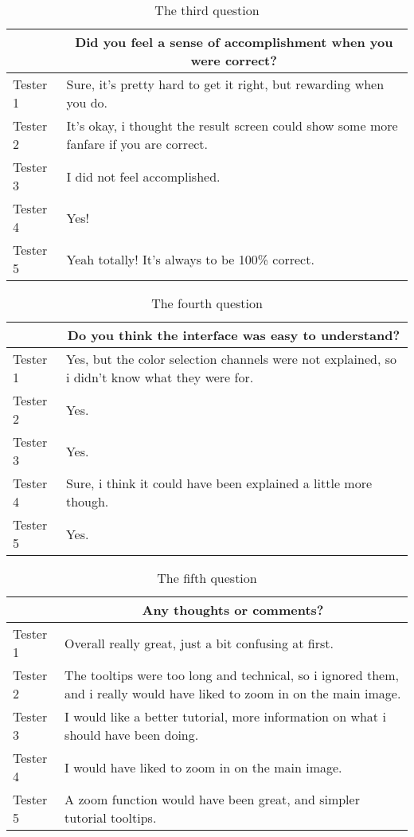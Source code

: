 \begin{table}[H]
\centering
\caption{The third question}
\label{tab:question3}
\begin{tabular}{p{1.3cm}p{10cm}}
\toprule
 & \multicolumn{1}{c}{Did you feel a sense of accomplishment when you were correct?} \\ \midrule
Tester 1 & Sure, it's pretty hard to get it right, but rewarding when you do. \\
Tester 2 & It's okay, i thought the result screen could show some more fanfare if you are correct. \\
Tester 3 & I did not feel accomplished. \\
Tester 4 & Yes! \\
Tester 5 & Yeah totally! It's always to be 100\% correct. \\ \bottomrule
\end{tabular}
\end{table}

\begin{table}[H]
\centering
\caption{The fourth question}
\label{tab:question4}
\begin{tabular}{p{1.3cm}p{10cm}}
\toprule
 & \multicolumn{1}{c}{Do you think the interface was easy to understand?} \\ \midrule
Tester 1 & Yes, but the color selection channels were not explained, so i didn't know what they were for. \\
Tester 2 & Yes. \\
Tester 3 & Yes. \\
Tester 4 & Sure, i think it could have been explained a little more though. \\
Tester 5 & Yes. \\ \bottomrule
\end{tabular}
\end{table}

\begin{table}[H]
\centering
\caption{The fifth question}
\label{tab:question5}
\begin{tabular}{p{1.3cm}p{10cm}}
\toprule
 & \multicolumn{1}{c}{Any thoughts or comments?} \\ \midrule
Tester 1 & Overall really great, just a bit confusing at first. \\
Tester 2 & The tooltips were too long and technical, so i ignored them, and i really would have liked to zoom in on the main image. \\
Tester 3 & I would like a better tutorial, more information on what i should have been doing. \\
Tester 4 & I would have liked to zoom in on the main image. \\
Tester 5 & A zoom function would have been great, and simpler tutorial tooltips. \\ \bottomrule
\end{tabular}
\end{table}